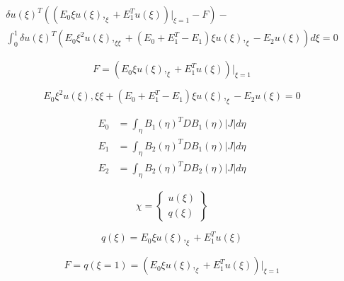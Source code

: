 \begin{equation}
    \begin{aligned}
        \delta u(\xi)^{T} \left(
            (E_0 \xi u(\xi),_{\xi}
            + E_1^T u(\xi))|_{\xi=1}
            - F
        \right) - \\
        \int_0^1 \delta u(\xi)^T\left(
            E_0 \xi^2 u(\xi),_{\xi\xi} + (E_0 + E_1^T - E_1) \xi u(\xi),_{\xi}
            - E_2 u(\xi)
        \right) d\xi = 0
    \end{aligned}
    \label{lr_eq:sbfem_virtual_work}
\end{equation}

\begin{equation}
    F = (E_0 \xi u(\xi),_{\xi} + E_1^T u(\xi))|_{\xi=1}
    \label{lr_eq:sbfem_nodal forces}
\end{equation}

\begin{equation}
    E_0 \xi^2 u(\xi),{\xi\xi} + (E_0 + E_1^T - E_1)\xi u(\xi),_{\xi} - E_2 u(\xi) = 0
    \label{lr_eq:sbfem_ODE}
\end{equation}

\begin{equation}
    \begin{aligned}
        E_0 &= \int_\eta B_1(\eta)^T DB_1(\eta)|J|d\eta \\
        E_1 &= \int_\eta B_2(\eta)^T DB_1(\eta)|J|d\eta \\
        E_2 &= \int_\eta B_2(\eta)^T DB_2(\eta)|J|d\eta
    \end{aligned}
    \label{lr_eq:sbfem_coe_matrix}
\end{equation}

\begin{equation}
    \chi = \left\{
        \begin{matrix}
            u(\xi)  \\
            q(\xi)
        \end{matrix}
    \right\}
    \label{lr_eq:sbfem_ODE_soltion}
\end{equation}


\begin{equation}
    q(\xi) = E_0 \xi u(\xi),_{\xi}
            + E_1^T u(\xi)
    \label{lr_eq:sbfem_internal_force}
\end{equation}

\begin{equation}
    F = q(\xi=1) = (E_0\xi u(\xi),_{\xi} + E_1^Tu(\xi))|_{\xi=1}
    \label{lr_eq:sbfem_boundary_nodal_force}
\end{equation}

